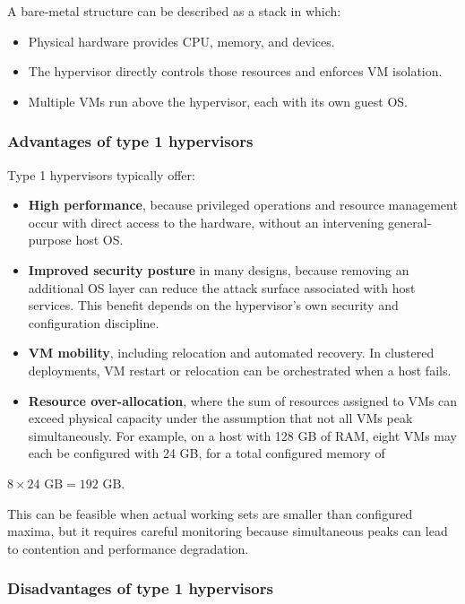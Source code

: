 \documentclass[11pt,a4paper,openany]{report}
\begin{document}
A bare-metal structure can be described as a stack in which:

\begin{itemize}
\item Physical hardware provides CPU, memory, and devices.
\item The hypervisor directly controls those resources and enforces VM isolation.
\item Multiple VMs run above the hypervisor, each with its own guest OS.
\end{itemize}

\subsubsection*{Advantages of type 1 hypervisors}

Type 1 hypervisors typically offer:

\begin{itemize}
\item \textbf{High performance}, because privileged operations and resource management occur with direct access to the hardware, without an intervening general-purpose host OS.
\item \textbf{Improved security posture} in many designs, because removing an additional OS layer can reduce the attack surface associated with host services. This benefit depends on the hypervisor's own security and configuration discipline.
\item \textbf{VM mobility}, including relocation and automated recovery. In clustered deployments, VM restart or relocation can be orchestrated when a host fails.
\item \textbf{Resource over-allocation}, where the sum of resources assigned to VMs can exceed physical capacity under the assumption that not all VMs peak simultaneously. For example, on a host with 128 GB of RAM, eight VMs may each be configured with 24 GB, for a total configured memory of
\end{itemize}

$8 \times 24\text{ GB} = 192\text{ GB}$.

This can be feasible when actual working sets are smaller than configured maxima, but it requires careful monitoring because simultaneous peaks can lead to contention and performance degradation.

\subsubsection*{Disadvantages of type 1 hypervisors}
\end{document}
